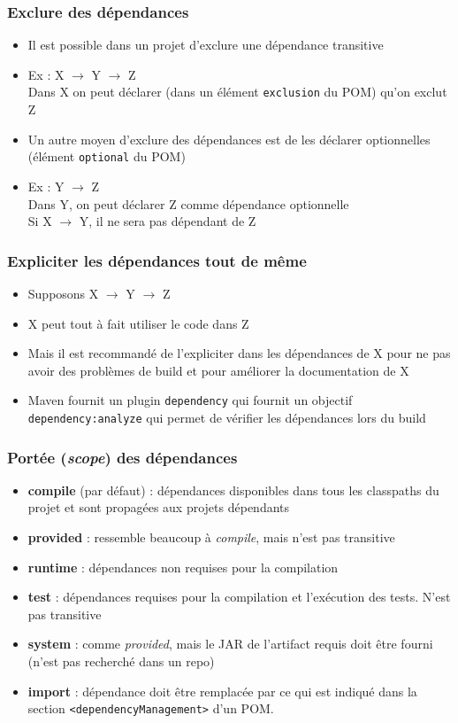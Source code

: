 \documentclass{beamer}
\begin{document}
\begin{frame}[fragile]
  \frametitle{Exclure des dépendances}
  \begin{itemize}
  \item Il est possible dans un projet d'exclure une dépendance
    transitive
  \item Ex : X $\rightarrow$ Y $\rightarrow$ Z\\
    Dans X on peut déclarer (dans un élément \texttt{exclusion} du
    POM) qu'on exclut Z
  \item Un autre moyen d'exclure des dépendances est de les déclarer
    optionnelles (élément \texttt{optional} du POM)
  \item Ex : Y $\rightarrow$ Z\\
    Dans Y, on peut déclarer Z comme dépendance optionnelle\\
    Si X $\rightarrow$ Y, il ne sera pas dépendant de Z\\
  \end{itemize}
\end{frame}

\begin{frame}[fragile]
  \frametitle{Expliciter les dépendances tout de même}
  \begin{itemize}
  \item Supposons X $\rightarrow$ Y $\rightarrow$ Z
  \item X peut tout à fait utiliser le code dans Z
  \item Mais il est recommandé de l'expliciter dans les dépendances de
    X pour ne pas avoir des problèmes de build et pour améliorer la
    documentation de X
  \item Maven fournit un plugin \texttt{dependency} qui fournit un
    objectif \texttt{dependency:analyze} qui permet de vérifier les
    dépendances lors du build
  \end{itemize}
\end{frame}

\begin{frame}[fragile]
  \frametitle{Portée (\textit{scope}) des dépendances}
  \begin{itemize}
  \item \textbf{compile} (par défaut) : dépendances disponibles dans
    tous les classpaths du projet et sont propagées aux projets
    dépendants
  \item \textbf{provided} : ressemble beaucoup à \textit{compile},
    mais n'est pas transitive
  \item \textbf{runtime} : dépendances non requises pour la compilation
  \item \textbf{test} : dépendances requises pour la compilation et
    l'exécution des tests. N'est pas transitive
  \item \textbf{system} : comme \textit{provided}, mais le JAR de
    l'artifact requis doit être fourni (n'est pas recherché dans un
    repo)
  \item \textbf{import} : dépendance doit être remplacée par ce qui
    est indiqué dans la section \texttt{<dependencyManagement>} d'un
    POM.
  \end{itemize}
\end{frame}
\end{document}
